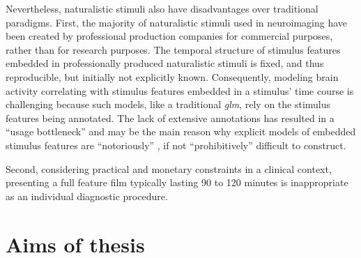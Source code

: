 Nevertheless, naturalistic stimuli also have disadvantages over traditional
paradigms.
First, the majority of naturalistic stimuli used in neuroimaging have been
created by professional production companies for commercial purposes, rather
than for research purposes.
The temporal structure of stimulus features embedded in professionally produced
naturalistic stimuli is fixed, and thus reproducible, but initially not
explicitly known.
Consequently, modeling brain activity correlating with stimulus features
embedded in a stimulus' time course is challenging
\citep{saarimaki2021naturalistic, simony2020analysis} because such models, like
a traditional \textit{\ac{glm}}, rely on the stimulus features being annotated.
The lack of extensive annotations has resulted in a ``usage bottleneck''
\citep[][p.  16]{aliko2020naturalistic} and may be the main reason why explicit
models of embedded stimulus features are ``notoriously'' \citep[][p.
1]{richard2019fast}, if not ``prohibitively'' \citep[p.
676]{nastase2019measuring} difficult to construct.


Second, considering practical and monetary constraints in a clinical context,
presenting a full feature film typically lasting 90 to 120 minutes is
inappropriate as an individual diagnostic procedure.



\section{Aims of thesis}


